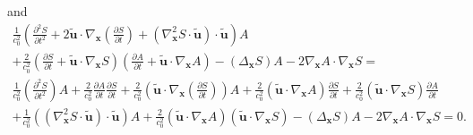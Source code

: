 \documentclass{article}
\theoremstyle{definition}
\theoremstyle{remark}
\renewcommand{\vec}[1]{\mathbf{#1}}
\begin{document}
and
\begin{multline}\label{MaxVacFullPPNmmmffffffiuiuhjuughbghhiuijghghghhhfhjj}
\frac{1}{c^2_0}\left(\frac{\partial^2 S}{\partial t^2}+2\vec {\tilde
u}\cdot \nabla_{\vec x}\left(\frac{\partial S}{\partial
t}\right)+\left(\nabla^2_{\vec x}S\cdot\vec {\tilde
u}\right)\cdot\vec {\tilde
u}\right)A\\+\frac{2}{c^2_0}\left(\frac{\partial S}{\partial t}+\vec
{\tilde u}\cdot\nabla_{\vec x}S\right)\left(\frac{\partial
A}{\partial t}+\vec {\tilde u}\cdot\nabla_{\vec
x}A\right)-\left(\Delta_{\vec x}S\right)A-2\nabla_{\vec
x}A\cdot\nabla_{\vec x}S=\\
\frac{1}{c^2_0}\left(\frac{\partial^2 S}{\partial
t^2}\right)A+\frac{2}{c^2_0}\frac{\partial A}{\partial
t}\frac{\partial S}{\partial t}+\frac{2 }{c^2_0}\left(\vec {\tilde
u}\cdot \nabla_{\vec x}\left(\frac{\partial S}{\partial
t}\right)\right)A+\frac{2}{c^2_0}\left(\vec {\tilde
u}\cdot\nabla_{\vec x}A\right)\frac{\partial S}{\partial
t}+\frac{2}{c^2_0}\left(\vec {\tilde u}\cdot\nabla_{\vec
x}S\right)\frac{\partial A}{\partial
t}\\+\frac{1}{c^2_0}\left(\left(\nabla^2_{\vec x}S\cdot\vec {\tilde
u}\right)\cdot\vec {\tilde u}\right)A+\frac{2}{c^2_0}\left(\vec
{\tilde u}\cdot\nabla_{\vec x}A\right)\left(\vec {\tilde
u}\cdot\nabla_{\vec x}S\right)-\left(\Delta_{\vec
x}S\right)A-2\nabla_{\vec x}A\cdot\nabla_{\vec x}S=0.
\end{multline}
\end{document}
